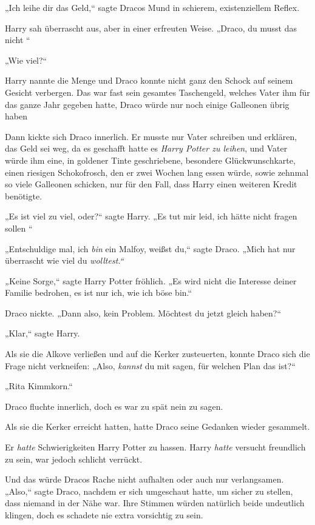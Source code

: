 {„Ich leihe dir das Geld,“ sagte Dracos Mund in schierem, existenziellem Reflex.

Harry sah überrascht aus, aber in einer erfreuten Weise. „Draco, du musst das nicht \later“

„Wie viel?“

Harry nannte die Menge und Draco konnte nicht ganz den Schock auf seinem Gesicht verbergen. Das war fast sein gesamtes Taschengeld, welches Vater ihm für das ganze Jahr gegeben hatte, Draco würde nur noch einige Galleonen übrig haben \later

Dann kickte sich Draco innerlich. Er musste nur Vater schreiben und erklären, das Geld sei weg, da es geschafft hatte es \emph{Harry Potter zu leihen}, und Vater würde ihm eine, in goldener Tinte geschriebene, besondere Glückwunschkarte, einen riesigen Schokofrosch, den er zwei Wochen lang essen würde, sowie zehnmal so viele Galleonen schicken, nur für den Fall, dass Harry einen weiteren Kredit benötigte.

„Es ist viel zu viel, oder?“ sagte Harry. „Es tut mir leid, ich hätte nicht fragen sollen \later“

„Entschuldige mal, ich \emph{bin} ein Malfoy, weißst du,“ sagte Draco. „Mich hat nur überrascht wie viel du \emph{wolltest.“}

\emph{„}Keine Sorge,“ sagte Harry Potter fröhlich. „Es wird nicht die Interesse deiner Familie bedrohen, es ist nur ich, wie ich böse bin.“

Draco nickte. „Dann also, kein Problem. Möchtest du jetzt gleich haben?“

„Klar,“ sagte Harry.

Als sie die Alkove verließen und auf die Kerker zusteuerten, konnte Draco sich die Frage nicht verkneifen: „Also, \emph{kannst} du mit sagen, für welchen Plan das ist?“

„Rita Kimmkorn.“

Draco fluchte innerlich, doch es war zu spät nein zu sagen.

Als sie die Kerker erreicht hatten, hatte Draco seine Gedanken wieder gesammelt.

Er \emph{hatte} Schwierigkeiten Harry Potter zu hassen. Harry \emph{hatte} versucht freundlich zu sein, war jedoch schlicht verrückt.

Und das würde Dracos Rache nicht aufhalten oder auch nur verlangsamen. „Also,“ sagte Draco, nachdem er sich umgeschaut hatte, um sicher zu stellen, dass niemand in der Nähe war. Ihre Stimmen würden natürlich beide undeutlich klingen, doch es schadete nie extra vorsichtig zu sein.

}
